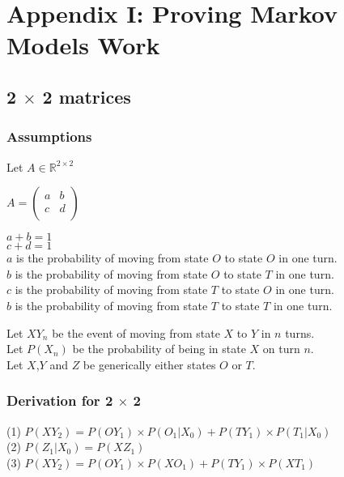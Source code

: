 \section{Appendix I: Proving Markov Models Work}
\subsection{2 $\times$ 2 matrices}
\subsubsection{Assumptions}

Let $A \in \mathbb{R}^{2\times2}$

$A =
\begin{pmatrix}
  a & b\\
  c & d\\
\end{pmatrix}
$

$a+b=1$\\
$c+d=1$\\
$a$ is the probability of moving from state $O$ to state $O$ in one turn.\\
$b$ is the probability of moving from state $O$ to state $T$ in one turn.\\
$c$ is the probability of moving from state $T$ to state $O$ in one turn.\\
$b$ is the probability of moving from state $T$ to state $T$ in one turn.

Let $XY_n$ be the event of moving from state $X$ to $Y$ in $n$ turns. \\
Let $P(X_n)$ be the probability of being in state $X$ on turn $n$.\\
Let $X$,$Y$ and $Z$ be generically either states $O$ or $T$.

\subsubsection{Derivation for 2 $\times$ 2}

(1) $P(XY_2) = P(OY_1) \times P(O_1|X_0)+P(TY_1) \times P(T_1|X_0)$\\
(2) $P(Z_1|X_0) = P(XZ_1)$\\
(3) $P(XY_2) = P(OY_1) \times P(XO_1)+P(TY_1) \times P(XT_1)$

